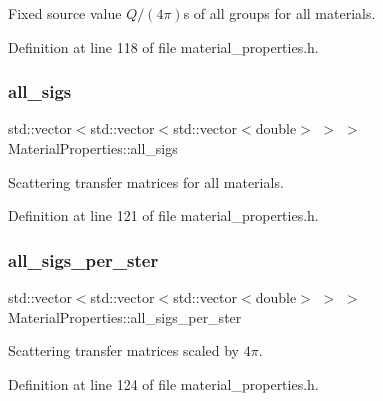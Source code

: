 Fixed source value $Q/(4\pi)$\textquotesingle{}s of all groups for all materials. 



Definition at line 118 of file material\+\_\+properties.\+h.

\mbox{\label{class_material_properties_a786a421a5a5c61a203b7517e7bafa829}} 
\subsubsection{\texorpdfstring{all\+\_\+sigs}{all\_sigs}}
{\footnotesize\ttfamily std\+::vector$<$std\+::vector$<$std\+::vector$<$double$>$ $>$ $>$ Material\+Properties\+::all\+\_\+sigs\hspace{0.3cm}{\ttfamily [private]}}



Scattering transfer matrices for all materials. 



Definition at line 121 of file material\+\_\+properties.\+h.

\mbox{\label{class_material_properties_a206fc7b81483c3430de643b4dc6598a4}} 
\subsubsection{\texorpdfstring{all\+\_\+sigs\+\_\+per\+\_\+ster}{all\_sigs\_per\_ster}}
{\footnotesize\ttfamily std\+::vector$<$std\+::vector$<$std\+::vector$<$double$>$ $>$ $>$ Material\+Properties\+::all\+\_\+sigs\+\_\+per\+\_\+ster\hspace{0.3cm}{\ttfamily [private]}}



Scattering transfer matrices scaled by $4\pi$. 



Definition at line 124 of file material\+\_\+properties.\+h.

\mbox{\label{class_material_properties_ac2a59b00e3be0e775249354182ae08a4}} 
